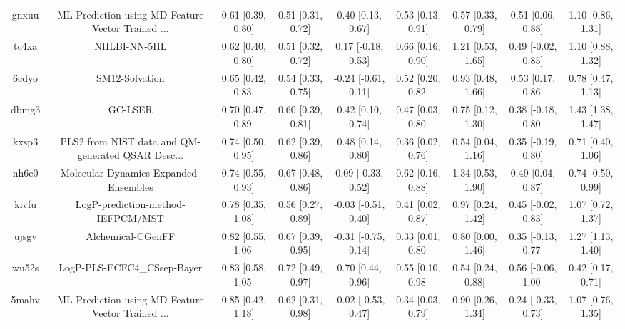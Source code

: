 \documentclass{article}
\begin{document}
\begin{center}
\begin{longtable}{|ccccccccc|}
 gnxuu &  ML Prediction using MD Feature Vector Trained ... &  0.61 [0.39, 0.80] &  0.51 [0.31, 0.72] &     0.40 [0.13, 0.67] &  0.53 [0.13, 0.91] &    0.57 [0.33, 0.79] &    0.51 [0.06, 0.88] &     1.10 [0.86, 1.31] \\
 tc4xa &                                       NHLBI-NN-5HL &  0.62 [0.40, 0.80] &  0.51 [0.32, 0.72] &    0.17 [-0.18, 0.53] &  0.66 [0.16, 0.90] &    1.21 [0.53, 1.65] &   0.49 [-0.02, 0.85] &     1.10 [0.88, 1.32] \\
 6cdyo &                                     SM12-Solvation &  0.65 [0.42, 0.83] &  0.54 [0.33, 0.75] &   -0.24 [-0.61, 0.11] &  0.52 [0.20, 0.82] &    0.93 [0.48, 1.66] &    0.53 [0.17, 0.86] &     0.78 [0.47, 1.13] \\
 dbmg3 &                                            GC-LSER &  0.70 [0.47, 0.89] &  0.60 [0.39, 0.81] &     0.42 [0.10, 0.74] &  0.47 [0.03, 0.80] &    0.75 [0.12, 1.30] &   0.38 [-0.18, 0.80] &     1.43 [1.38, 1.47] \\
 kxsp3 &  PLS2 from NIST data and QM-generated QSAR Desc... &  0.74 [0.50, 0.95] &  0.62 [0.39, 0.86] &     0.48 [0.14, 0.80] &  0.36 [0.02, 0.76] &    0.54 [0.04, 1.16] &   0.35 [-0.19, 0.80] &     0.71 [0.40, 1.06] \\
 nh6c0 &              Molecular-Dynamics-Expanded-Ensembles &  0.74 [0.55, 0.93] &  0.67 [0.48, 0.86] &    0.09 [-0.33, 0.52] &  0.62 [0.16, 0.88] &    1.34 [0.53, 1.90] &    0.49 [0.04, 0.87] &     0.74 [0.50, 0.99] \\
 kivfu &                  LogP-prediction-method-IEFPCM/MST &  0.78 [0.35, 1.08] &  0.56 [0.27, 0.89] &   -0.03 [-0.51, 0.40] &  0.41 [0.02, 0.87] &    0.97 [0.24, 1.42] &   0.45 [-0.02, 0.83] &     1.07 [0.72, 1.37] \\
 ujsgv &                                  Alchemical-CGenFF &  0.82 [0.55, 1.06] &  0.67 [0.39, 0.95] &   -0.31 [-0.75, 0.14] &  0.33 [0.01, 0.80] &    0.80 [0.00, 1.46] &   0.35 [-0.13, 0.77] &     1.27 [1.13, 1.40] \\
 wu52s &                        LogP-PLS-ECFC4\_CSsep-Bayer &  0.83 [0.58, 1.05] &  0.72 [0.49, 0.97] &     0.70 [0.44, 0.96] &  0.55 [0.10, 0.98] &    0.54 [0.24, 0.88] &   0.56 [-0.06, 1.00] &     0.42 [0.17, 0.71] \\
 5mahv &  ML Prediction using MD Feature Vector Trained ... &  0.85 [0.42, 1.18] &  0.62 [0.31, 0.98] &   -0.02 [-0.53, 0.47] &  0.34 [0.03, 0.79] &    0.90 [0.26, 1.34] &   0.24 [-0.33, 0.73] &     1.07 [0.76, 1.35] \\

\end{longtable}
\end{center}
\end{document}
